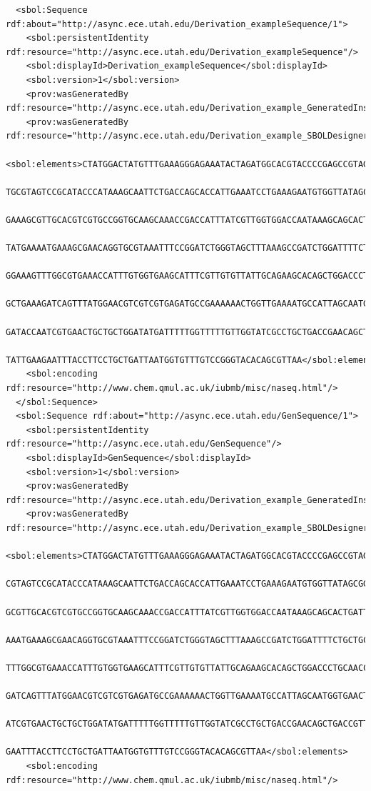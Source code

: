 \begin{lstlisting}
  <sbol:Sequence rdf:about="http://async.ece.utah.edu/Derivation_exampleSequence/1">
    <sbol:persistentIdentity rdf:resource="http://async.ece.utah.edu/Derivation_exampleSequence"/>
    <sbol:displayId>Derivation_exampleSequence</sbol:displayId>
    <sbol:version>1</sbol:version>
    <prov:wasGeneratedBy rdf:resource="http://async.ece.utah.edu/Derivation_example_GeneratedInstance21_SBOLDesignerActivity/1"/>
    <prov:wasGeneratedBy rdf:resource="http://async.ece.utah.edu/Derivation_example_SBOLDesignerActivity/1"/>
    <sbol:elements>CTATGGACTATGTTTGAAAGGGAGAAATACTAGATGGCACGTACCCCGAGCCGTAGCAGCATTGGTAGCC
    TGCGTAGTCCGCATACCCATAAAGCAATTCTGACCAGCACCATTGAAATCCTGAAAGAATGTGGTTATAGCGGTCTGAGCATT
    GAAAGCGTTGCACGTCGTGCCGGTGCAAGCAAACCGACCATTTATCGTTGGTGGACCAATAAAGCAGCACTGATTGCCGAAGTG
    TATGAAAATGAAAGCGAACAGGTGCGTAAATTTCCGGATCTGGGTAGCTTTAAAGCCGATCTGGATTTTCTGCTGCGTAATCTGT
    GGAAAGTTTGGCGTGAAACCATTTGTGGTGAAGCATTTCGTTGTGTTATTGCAGAAGCACAGCTGGACCCTGCAACCCTGACCCA
    GCTGAAAGATCAGTTTATGGAACGTCGTCGTGAGATGCCGAAAAAACTGGTTGAAAATGCCATTAGCAATGGTGAACTGCCGAAA
    GATACCAATCGTGAACTGCTGCTGGATATGATTTTTGGTTTTTGTTGGTATCGCCTGCTGACCGAACAGCTGACCGTTGAACAGGA
    TATTGAAGAATTTACCTTCCTGCTGATTAATGGTGTTTGTCCGGGTACACAGCGTTAA</sbol:elements>
    <sbol:encoding rdf:resource="http://www.chem.qmul.ac.uk/iubmb/misc/naseq.html"/>
  </sbol:Sequence>
  <sbol:Sequence rdf:about="http://async.ece.utah.edu/GenSequence/1">
    <sbol:persistentIdentity rdf:resource="http://async.ece.utah.edu/GenSequence"/>
    <sbol:displayId>GenSequence</sbol:displayId>
    <sbol:version>1</sbol:version>
    <prov:wasGeneratedBy rdf:resource="http://async.ece.utah.edu/Derivation_example_GeneratedInstance21_SBOLDesignerActivity/1"/>
    <prov:wasGeneratedBy rdf:resource="http://async.ece.utah.edu/Derivation_example_SBOLDesignerActivity/1"/>
    <sbol:elements>CTATGGACTATGTTTGAAAGGGAGAAATACTAGATGGCACGTACCCCGAGCCGTAGCAGCATTGGTAGCCTG
    CGTAGTCCGCATACCCATAAAGCAATTCTGACCAGCACCATTGAAATCCTGAAAGAATGTGGTTATAGCGGTCTGAGCATTGAAA
    GCGTTGCACGTCGTGCCGGTGCAAGCAAACCGACCATTTATCGTTGGTGGACCAATAAAGCAGCACTGATTGCCGAAGTGTATGA
    AAATGAAAGCGAACAGGTGCGTAAATTTCCGGATCTGGGTAGCTTTAAAGCCGATCTGGATTTTCTGCTGCGTAATCTGTGGAAAG
    TTTGGCGTGAAACCATTTGTGGTGAAGCATTTCGTTGTGTTATTGCAGAAGCACAGCTGGACCCTGCAACCCTGACCCAGCTGAAA
    GATCAGTTTATGGAACGTCGTCGTGAGATGCCGAAAAAACTGGTTGAAAATGCCATTAGCAATGGTGAACTGCCGAAAGATACCA
    ATCGTGAACTGCTGCTGGATATGATTTTTGGTTTTTGTTGGTATCGCCTGCTGACCGAACAGCTGACCGTTGAACAGGATATTGAA
    GAATTTACCTTCCTGCTGATTAATGGTGTTTGTCCGGGTACACAGCGTTAA</sbol:elements>
    <sbol:encoding rdf:resource="http://www.chem.qmul.ac.uk/iubmb/misc/naseq.html"/>

\end{lstlisting}
